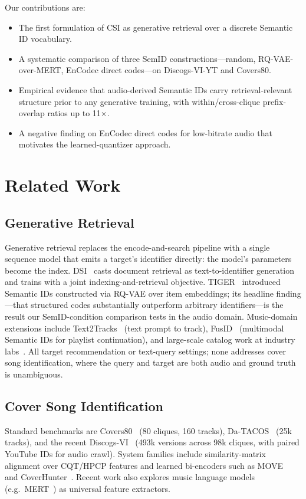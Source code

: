 \documentclass[conference]{IEEEtran}
\begin{document}
Our contributions are:
\begin{itemize}
\item The first formulation of CSI as generative retrieval over a discrete Semantic ID vocabulary.
\item A systematic comparison of three SemID constructions---random, RQ-VAE-over-MERT, EnCodec direct codes---on Discogs-VI-YT and Covers80.
\item Empirical evidence that audio-derived Semantic IDs carry retrieval-relevant structure prior to any generative training, with within/cross-clique prefix-overlap ratios up to 11$\times$.
\item A negative finding on EnCodec direct codes for low-bitrate audio that motivates the learned-quantizer approach.
\end{itemize}

\section{Related Work}

\subsection{Generative Retrieval}
Generative retrieval replaces the encode-and-search pipeline with a single sequence model that emits a target's identifier directly: the model's parameters become the index. DSI~\cite{tay2022dsi} casts document retrieval as text-to-identifier generation and trains with a joint indexing-and-retrieval objective. TIGER~\cite{rajput2023tiger} introduced Semantic IDs constructed via RQ-VAE over item embeddings; its headline finding---that structured codes substantially outperform arbitrary identifiers---is the result our SemID-condition comparison tests in the audio domain. Music-domain extensions include Text2Tracks~\cite{palumbo2025text2tracks} (text prompt to track), FusID~\cite{kim2026fusid} (multimodal Semantic IDs for playlist continuation), and large-scale catalog work at industry labs~\cite{mei2025semids}. All target recommendation or text-query settings; none addresses cover song identification, where the query and target are both audio and ground truth is unambiguous.

\subsection{Cover Song Identification}
Standard benchmarks are Covers80~\cite{ellis2007covers80} (80 cliques, 160 tracks), Da-TACOS~\cite{yesiler2019datacos} (25k tracks), and the recent Discogs-VI~\cite{araz2024discogsvi} (493k versions across 98k cliques, with paired YouTube IDs for audio crawl). System families include similarity-matrix alignment over CQT/HPCP features and learned bi-encoders such as MOVE~\cite{yesiler2019move} and CoverHunter~\cite{doh2021coverhunter}. Recent work also explores music language models (e.g.\ MERT~\cite{yuan2023mert}) as universal feature extractors.
\end{document}
